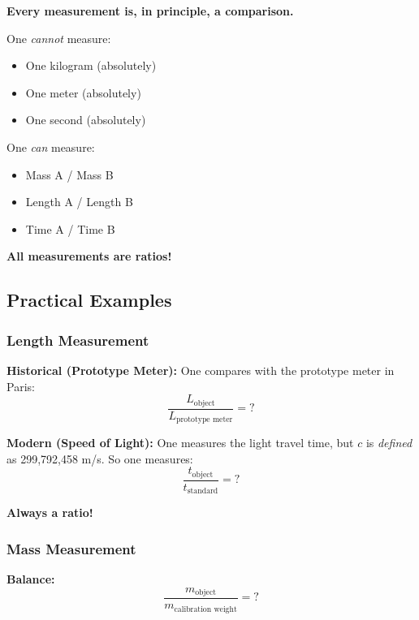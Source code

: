\begin{theorem}
	\textbf{Every measurement is, in principle, a comparison.}
	
	One \textit{cannot} measure:
	\begin{itemize}[nosep]
		\item One kilogram (absolutely)
		\item One meter (absolutely)
		\item One second (absolutely)
	\end{itemize}
	
	One \textit{can} measure:
	\begin{itemize}[nosep]
		\item Mass A / Mass B
		\item Length A / Length B
		\item Time A / Time B
	\end{itemize}
	
	\textbf{All measurements are ratios!}
\end{theorem}

\subsection{Practical Examples}

\subsubsection{Length Measurement}

\textbf{Historical (Prototype Meter):}
One compares with the prototype meter in Paris:
\begin{equation}
	\frac{L_\text{object}}{L_\text{prototype meter}} = ?
\end{equation}

\textbf{Modern (Speed of Light):}
One measures the light travel time, but $c$ is \textit{defined} as 299,792,458 m/s. So one measures:
\begin{equation}
	\frac{t_\text{object}}{t_\text{standard}} = ?
\end{equation}

\textbf{Always a ratio!}

\subsubsection{Mass Measurement}

\textbf{Balance:}
\begin{equation}
	\frac{m_\text{object}}{m_\text{calibration weight}} = ?
\end{equation}

